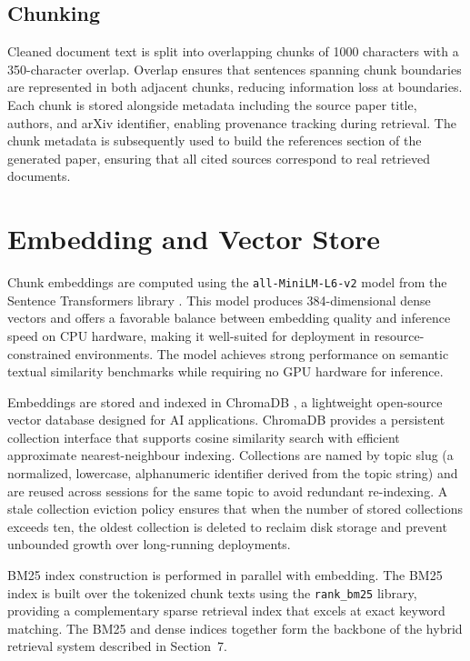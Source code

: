 \documentclass[12pt, a4paper]{article}
\begin{document}
\subsection{Chunking}

Cleaned document text is split into overlapping chunks of 1000 characters with a
350-character overlap. Overlap ensures that sentences spanning chunk boundaries
are represented in both adjacent chunks, reducing information loss at boundaries.
Each chunk is stored alongside metadata including the source paper title, authors,
and arXiv identifier, enabling provenance tracking during retrieval. The chunk
metadata is subsequently used to build the references section of the generated
paper, ensuring that all cited sources correspond to real retrieved documents.

\section{Embedding and Vector Store}

Chunk embeddings are computed using the \texttt{all-MiniLM-L6-v2} model
\cite{wang2020} from the Sentence Transformers library \cite{reimers2019}. This
model produces 384-dimensional dense vectors and offers a favorable balance between
embedding quality and inference speed on CPU hardware, making it well-suited for
deployment in resource-constrained environments. The model achieves strong
performance on semantic textual similarity benchmarks while requiring no GPU
hardware for inference.

Embeddings are stored and indexed in ChromaDB \cite{chroma2024}, a lightweight
open-source vector database designed for AI applications. ChromaDB provides a
persistent collection interface that supports cosine similarity search with
efficient approximate nearest-neighbour indexing. Collections are named by topic
slug (a normalized, lowercase, alphanumeric identifier derived from the topic
string) and are reused across sessions for the same topic to avoid redundant
re-indexing. A stale collection eviction policy ensures that when the number of
stored collections exceeds ten, the oldest collection is deleted to reclaim disk
storage and prevent unbounded growth over long-running deployments.

BM25 index construction is performed in parallel with embedding. The BM25 index
is built over the tokenized chunk texts using the \texttt{rank\_bm25} library,
providing a complementary sparse retrieval index that excels at exact keyword
matching. The BM25 and dense indices together form the backbone of the hybrid
retrieval system described in Section~7.
\end{document}

